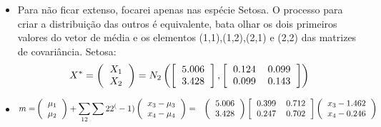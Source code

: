 \documentclass[11pt,a4paper]{book}
\begin{document}
\begin{enumerate}
\begin{itemize}
		\item 
		
		Para não ficar extenso, focarei apenas nas espécie Setosa.
		O processo para criar a distribuição das outros é equivalente, bata olhar os dois primeiros valores do vetor de média e os elementos (1,1),(1,2),(2,1) e (2,2) das matrizes de covariância.
		Setosa:
		\begin{eqnarray*}
			X^*=\left(\begin{tabular}{c}
			$X_1$\\
			$X_2$\\
			\end{tabular}
			\right)=N_2\left(
			\left[
			\begin{tabular}{c}
			5.006\\
			3.428\\
			\end{tabular}
			\right],
			\left[
			\begin{tabular}{c c}
			0.124 & 0.099\\
			0.099 & 0.143\\
			\end{tabular}
			\right]
			\right)
		\end{eqnarray*}
		
		\item
		\begin{eqnarray*}
			m=&\left(
			\begin{tabular}{c}
			$\mu_1$\\
			$\mu_2$\\
			\end{tabular}
			\right)+\sum_{12}\sum{22}^(-1)
			\left(
			\begin{tabular}{c}
			$x_3-\mu_3$\\
			$x_4-\mu_4$
			\end{tabular}
			\right)
			=&\left(
			\begin{tabular}{c}
			5.006\\
			3.428\\
			\end{tabular}
			\right)
			\left[
			\begin{tabular}{c c}
			0.399 & 0.712\\
			0.247 & 0.702\\
			\end{tabular}
			\right]
			\left(
			\begin{tabular}{c}
			$x_3-1.462$\\
			$x_4-0.246$
			\end{tabular}
			\right)
		\end{eqnarray*}
		

\end{itemize}
\end{enumerate}
\end{document}
